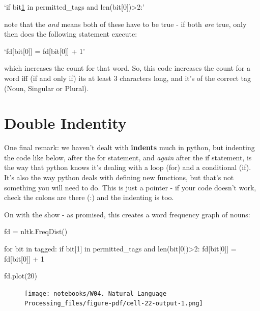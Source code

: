\documentclass[
  letterpaper,
  DIV=11,
  numbers=noendperiod]{scrreprt}
\newenvironment{Shaded}{\begin{snugshade}}{\end{snugshade}}
\newcommand{\BuiltInTok}[1]{\textcolor[rgb]{0.00,0.23,0.31}{#1}}
\newcommand{\ControlFlowTok}[1]{\textcolor[rgb]{0.00,0.23,0.31}{#1}}
\newcommand{\DecValTok}[1]{\textcolor[rgb]{0.68,0.00,0.00}{#1}}
\newcommand{\KeywordTok}[1]{\textcolor[rgb]{0.00,0.23,0.31}{#1}}
\newcommand{\NormalTok}[1]{\textcolor[rgb]{0.00,0.23,0.31}{#1}}
\newcommand{\OperatorTok}[1]{\textcolor[rgb]{0.37,0.37,0.37}{#1}}
\begin{document}
`if bit\href{http://www.literateprogramming.com/lpquotes.html}{1} in
permitted\_tags and len(bit{[}0{]})\textgreater2:'

note that the \emph{and} means both of these have to be true - if both
\emph{are} true, only then does the following statement execute:

`fd{[}bit{[}0{]}{]} = fd{[}bit{[}0{]}{]} + 1'

which increases the count for that word. So, this code increases the
count for a word iff (if and only if) its at least 3 characters long,
and it's of the correct tag (Noun, Singular or Plural).

\hypertarget{double-indentity}{%
\section{Double Indentity}\label{double-indentity}}

One final remark: we haven't dealt with \textbf{indents} much in python,
but indenting the code like below, after the for statement, and
\emph{again} after the if statement, is the way that python knows it's
dealing with a loop (for) and a conditional (if). It's also the way
python deals with defining new functions, but that's not something you
will need to do. This is just a pointer - if your code doesn't work,
check the colons are there (:) and the indenting is too.

On with the show - as promised, this creates a word frequency graph of
nouns:

\begin{Shaded}
\begin{Highlighting}[]
\NormalTok{fd }\OperatorTok{=}\NormalTok{ nltk.FreqDist()}

\ControlFlowTok{for}\NormalTok{ bit }\KeywordTok{in}\NormalTok{ tagged:}
    \ControlFlowTok{if}\NormalTok{ bit[}\DecValTok{1}\NormalTok{] }\KeywordTok{in}\NormalTok{ permitted\_tags }\KeywordTok{and} \BuiltInTok{len}\NormalTok{(bit[}\DecValTok{0}\NormalTok{])}\OperatorTok{\textgreater{}}\DecValTok{2}\NormalTok{:}
\NormalTok{        fd[bit[}\DecValTok{0}\NormalTok{]] }\OperatorTok{=}\NormalTok{ fd[bit[}\DecValTok{0}\NormalTok{]] }\OperatorTok{+} \DecValTok{1}
        
\NormalTok{fd.plot(}\DecValTok{20}\NormalTok{)}
\end{Highlighting}
\end{Shaded}

\begin{figure}[H]

{\centering \texttt{[image: notebooks/W04. Natural Language Processing\_files/figure-pdf/cell-22-output-1.png]}

}

\end{figure}
\end{document}
